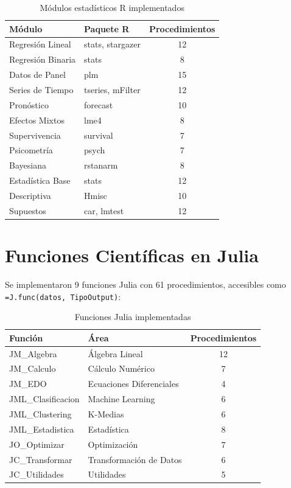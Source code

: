 \documentclass[12pt, a4paper]{report}
\begin{document}
\begin{table}[h]
\centering
\begin{tabular}{llc}
\toprule
\textbf{Módulo} & \textbf{Paquete R} & \textbf{Procedimientos} \\
\midrule
Regresión Lineal & stats, stargazer & 12 \\
Regresión Binaria & stats & 8 \\
Datos de Panel & plm & 15 \\
Series de Tiempo & tseries, mFilter & 12 \\
Pronóstico & forecast & 10 \\
Efectos Mixtos & lme4 & 8 \\
Supervivencia & survival & 7 \\
Psicometría & psych & 7 \\
Bayesiana & rstanarm & 8 \\
Estadística Base & stats & 12 \\
Descriptiva & Hmisc & 10 \\
Supuestos & car, lmtest & 12 \\
\bottomrule
\end{tabular}
\caption{Módulos estadísticos R implementados}
\end{table}

\section{Funciones Científicas en Julia}

Se implementaron 9 funciones Julia con 61 procedimientos, accesibles como \texttt{=J.func(datos, TipoOutput)}:

\begin{table}[h]
\centering
\begin{tabular}{llc}
\toprule
\textbf{Función} & \textbf{Área} & \textbf{Procedimientos} \\
\midrule
JM\_Algebra & Álgebra Lineal & 12 \\
JM\_Calculo & Cálculo Numérico & 7 \\
JM\_EDO & Ecuaciones Diferenciales & 4 \\
JML\_Clasificacion & Machine Learning & 6 \\
JML\_Clustering & K-Medias & 6 \\
JML\_Estadistica & Estadística & 8 \\
JO\_Optimizar & Optimización & 7 \\
JC\_Transformar & Transformación de Datos & 6 \\
JC\_Utilidades & Utilidades & 5 \\
\bottomrule
\end{tabular}
\caption{Funciones Julia implementadas}
\end{table}
\end{document}
